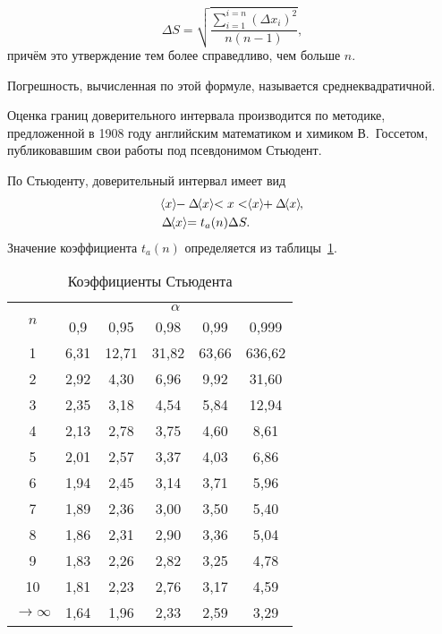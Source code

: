 \documentclass[a4paper, 12pt]{extarticle}
\newcommand{\nisum}{\sum\limits_{i=1}^{i=n}} %
\begin{document}
\begin{equation}
\label{eq:mean-error}
\Delta S = \sqrt{\frac{\nisum \left(\Delta x_i \right)^2}{n (n - 1)}},
\end{equation}
причём это утверждение тем более справедливо, чем больше $n$.

Погрешность, вычисленная по этой формуле, называется среднеквадратичной.

Оценка границ доверительного интервала производится по методике, предложенной в 1908 году английским математиком и химиком В.~Госсетом, публиковавшим свои работы под псевдонимом Стьюдент.

По Стьюденту, доверительный интервал имеет вид
\begin{align}
    &\MTDMean{x} - \Delta \MTDMean{x} < x < \MTDMean{x} + \Delta \MTDMean{x}, \\
    \label{eq:student-s}
    & \Delta  \MTDMean{x} = t_a(n)\Delta S.
\end{align}
Значение коэффициента $t_a(n)$ определяется из таблицы~\ref{tab:student-s-coef}.
\begin{table}[t]
\caption{Коэффициенты Стьюдента \label{tab:student-s-coef}}
\begin{center}
\begin{tabular}{|c|c|c|c|c|c|}
\hline
\multirow{2}{*}{$n$} & \multicolumn{5}{|c|}{$\alpha$} \\ \cline{2-6}
   & 0,9 & 0,95 & 0,98 & 0,99 & 0,999 \\ \hline
1 & 6,31 & 12,71 &  31,82 &  63,66 & 636,62 \\ \hline
2 & 2,92 & 4,30  & 6,96 & 9,92 & 31,60 \\ \hline
3 & 2,35  & 3,18 & 4,54 & 5,84 & 12,94 \\ \hline
4 & 2,13 & 2,78 & 3,75 & 4,60 & 8,61 \\ \hline
5 & 2,01 & 2,57 & 3,37 & 4,03 & 6,86 \\ \hline
6 & 1,94 & 2,45 & 3,14 & 3,71 & 5,96 \\ \hline
7 & 1,89& 2,36 & 3,00 & 3,50 & 5,40 \\ \hline
8 &1,86 &2,31 &2,90 &3,36& 5,04 \\ \hline
9 &1,83 &2,26& 2,82 &3,25& 4,78  \\ \hline
10 &1,81 &2,23& 2,76 &3,17 &4,59  \\ \hline
$\to \infty$ &  1,64 & 1,96 & 2,33 &2,59 & 3,29 \\ \hline
\end{tabular}
\end{center}
\end{table}
\end{document}
